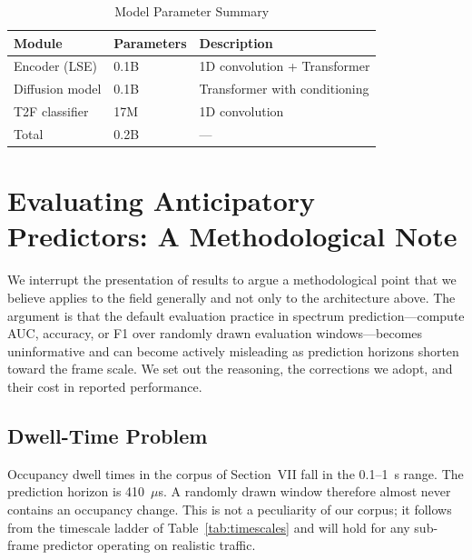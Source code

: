 \documentclass[lettersize,journal]{IEEEtran}
\newcommand{\us}{\ensuremath{\mu}s}
\begin{document}
\begin{table}[!t]
\centering
\caption{Model Parameter Summary}
\label{tab:params}
\renewcommand{\arraystretch}{1.2}
\begin{tabular}{@{}lll@{}}
\toprule
\textbf{Module} & \textbf{Parameters} & \textbf{Description} \\
\midrule
Encoder (LSE)   & 0.1B & 1D convolution + Transformer \\
Diffusion model & 0.1B & Transformer with conditioning \\
T2F classifier  & 17M  & 1D convolution \\
\midrule
Total           & 0.2B & --- \\
\bottomrule
\end{tabular}
\end{table}

\section{\textbf{Evaluating Anticipatory Predictors: A Methodological Note}}

We interrupt the presentation of results to argue a methodological point
that we believe applies to the field generally and not only to the
architecture above. The argument is that the default evaluation practice
in spectrum prediction---compute AUC, accuracy, or F1 over randomly drawn
evaluation windows---becomes uninformative and can become actively
misleading as prediction horizons shorten toward the frame scale. We set
out the reasoning, the corrections we adopt, and their cost in reported
performance.

\subsection{\textbf{Dwell-Time Problem}}
Occupancy dwell times in the corpus of Section~VII fall in the 0.1--1~s
range. The prediction horizon is 410~\us. A randomly drawn window
therefore almost never contains an occupancy change. This is not a
peculiarity of our corpus; it follows from the timescale ladder of
Table~\ref{tab:timescales} and will hold for any sub-frame predictor
operating on realistic traffic.
\end{document}
